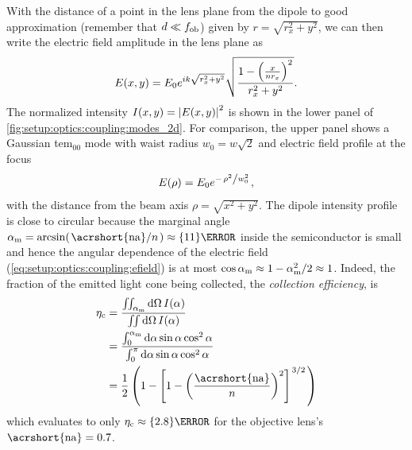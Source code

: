 With the distance of a point in the lens plane from the dipole to good approximation (remember that $d\ll f_{\mathrm{ob}}$) given by $r = \sqrt{r_{x}^2 + y^2}$, we can then write the electric field amplitude in the lens plane as
\begin{equation}
    E(x, y) = E_0e^{i k \sqrt{r_{x}^2 + y^2}}\sqrt{\frac{1 - \left(\frac{x}{n r_{x}}\right)^2}{r_{x}^2 + y^2}}.
\end{equation}
The normalized intensity $I(x, y) = \abs{E(x, y)}^2$ is shown in the lower panel of \cref{fig:setup:optics:coupling:modes_2d}.
For comparison, the upper panel shows a Gaussian \acrshort{tem}$_{00}$ mode with waist radius $w_0=w\sqrt{2}$ and electric field profile at the focus~\cite{Yariv1989}
\begin{equation}\label{eq:setup:optics:coupling:tem00}
    E(\rho) = E_0\e^{-\flatfrac{\rho^2}{w_0^{2}}},
\end{equation}
with the distance from the beam axis $\rho = \sqrt{x^2 + y^2}$.
The dipole intensity profile is close to circular because the marginal angle $\alpha_\mr{m}=\arcsin(\flatfrac{\mr{\acrshort{na}}}{n})\approx\qty{11}{\degree}$ inside the semiconductor is small and hence the angular dependence of the electric field (\cf \cref{eq:setup:optics:coupling:efield}) is at most $\cos\alpha_{\mathrm{m}}\approx 1 - \alpha_{\mathrm{m}}^2/2 \approx 1$.
Indeed, the fraction of the emitted light cone being collected, the \emph{collection efficiency}, is
\begin{equation}\label{eq:setup:optics:coupling:efficiency:collection}
    \begin{split}
        \eta_{\mr{c}} &= \frac{\iint_{\alpha_{\mr{m}}}\dd{\Omega} I(\alpha)}{\iint\dd{\Omega} I(\alpha)} \\
                      &= \frac{\int_{0}^{\alpha_{\mr{m}}}\dd{\alpha}\sin\alpha\cos^2\alpha}{\int_{0}^{\pi}\dd{\alpha}\sin\alpha\cos^2\alpha} \\
                      &= \frac{1}{2}\left(1 - \left[1 - \left(\frac{\mr{\acrshort{na}}}{n}\right)^2\right]^{\flatfrac{3}{2}}\right)
    \end{split}
\end{equation}
which evaluates to only $\eta_{\mr{c}}\approx\qty{2.8}{\percent}$ for the objective lens's $\mr{\acrshort{na}}=\num{0.7}$.


